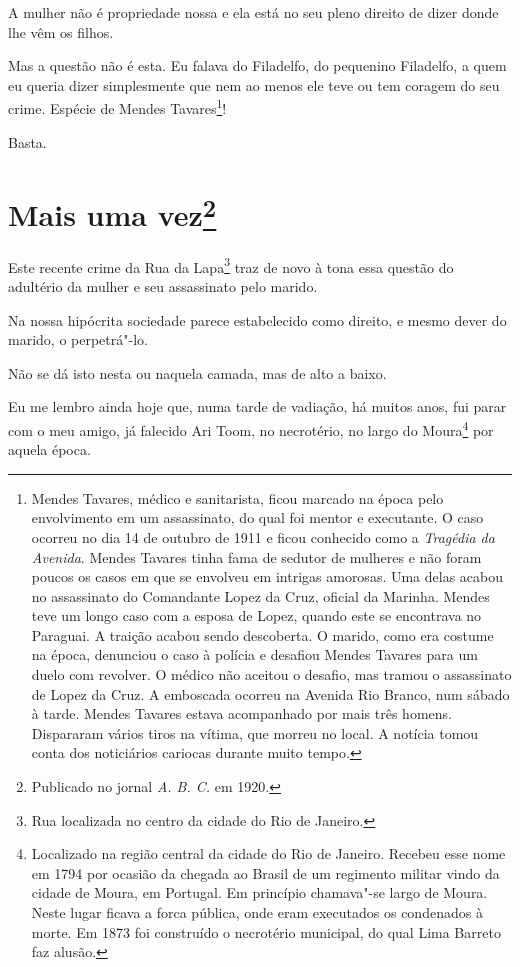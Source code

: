 A mulher não é propriedade nossa e ela está no seu pleno direito de
dizer donde lhe vêm os filhos.

Mas a questão não é esta. Eu falava do Filadelfo, do pequenino
Filadelfo, a quem eu queria dizer simplesmente que nem ao menos ele teve
ou tem coragem do seu crime. Espécie de Mendes Tavares\footnote{Mendes
  Tavares, médico e sanitarista, ficou marcado na época pelo
  envolvimento em um assassinato, do qual foi mentor e executante. O
  caso ocorreu no dia 14 de outubro de 1911 e ficou conhecido como a
  \emph{Tragédia da Avenida}. Mendes Tavares tinha fama de sedutor de
  mulheres e não foram poucos os casos em que se envolveu em intrigas
  amorosas. Uma delas acabou no assassinato do Comandante Lopez da Cruz,
  oficial da Marinha. Mendes teve um longo caso com a esposa de Lopez,
  quando este se encontrava no Paraguai. A traição acabou sendo
  descoberta. O marido, como era costume na época, denunciou o caso à
  polícia e desafiou Mendes Tavares para um duelo com revolver. O médico
  não aceitou o desafio, mas tramou o assassinato de Lopez da Cruz. A
  emboscada ocorreu na Avenida Rio Branco, num sábado à tarde. Mendes
  Tavares estava acompanhado por mais três homens. Dispararam vários
  tiros na vítima, que morreu no local. A notícia tomou conta dos
  noticiários cariocas durante muito tempo.}!

Basta.



\chapter[Mais uma vez]{Mais uma vez\footnote[*]{Publicado no jornal \emph{A. B. C.} em 1920.}}

Este recente crime da Rua da Lapa\footnote{Rua localizada no centro da
  cidade do Rio de Janeiro.} traz de novo à tona essa questão do
adultério da mulher e seu assassinato pelo marido.

Na nossa hipócrita sociedade parece estabelecido como direito, e mesmo
dever do marido, o perpetrá"-lo.

Não se dá isto nesta ou naquela camada, mas de alto a baixo.

Eu me lembro ainda hoje que, numa tarde de vadiação, há muitos anos, fui
parar com o meu amigo, já falecido Ari Toom, no necrotério, no largo do
Moura\footnote{Localizado na região central da cidade do Rio de Janeiro.
  Recebeu esse nome em 1794 por ocasião da chegada ao Brasil de um
  regimento militar vindo da cidade de Moura, em Portugal. Em princípio
  chamava"-se largo de Moura. Neste lugar ficava a forca pública, onde
  eram executados os condenados à morte. Em 1873 foi construído o
  necrotério municipal, do qual Lima Barreto faz alusão.} por aquela
época.

